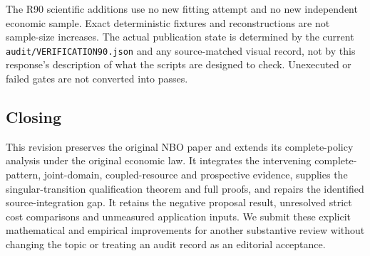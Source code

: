 The R90 scientific additions use no new fitting attempt and no new
independent economic sample. Exact deterministic fixtures and
reconstructions are not sample-size increases. The actual publication
state is determined by the current \texttt{audit/VERIFICATION90.json}
and any source-matched visual record, not by this response's description
of what the scripts are designed to check. Unexecuted or failed gates
are not converted into passes.

\hypertarget{closing}{%
\subsection{Closing}\label{closing}}

This revision preserves the original NBO paper and extends its
complete-policy analysis under the original economic law. It integrates
the intervening complete-pattern, joint-domain, coupled-resource and
prospective evidence, supplies the singular-transition qualification
theorem and full proofs, and repairs the identified source-integration
gap. It retains the negative proposal result, unresolved strict cost
comparisons and unmeasured application inputs. We submit these explicit
mathematical and empirical improvements for another substantive review
without changing the topic or treating an audit record as an editorial
acceptance.
